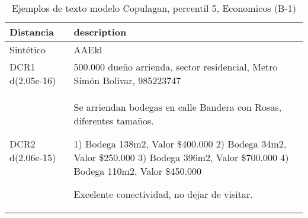 \begin{table}[H]
\centering
\fontsize{10}{14}\selectfont
\caption{Ejemplos de texto modelo Copulagan, percentil 5, Economicos (B-1)}
\label{table-example-economicos-b-1-copulagan-5p-text}
\begin{tabular}{|l|m{35em}|}
\hline
\rowcolor[gray]{0.8}
Distancia & description \\
\hline Sintético & AAEkl \\
\hline DCR1 d(2.05e-16) & 500.000  due\~no arrienda, sector residencial, Metro Sim\'on Bolivar, 985223747 \\
\hline DCR2 d(2.06e-15) & Se arriendan bodegas en calle Bandera con Rosas, diferentes tama\~nos.

1) Bodega 138m2, Valor \$400.000
2) Bodega 34m2, Valor \$250.000
3) Bodega 396m2, Valor \$700.000
4) Bodega 110m2, Valor \$450.000

Excelente conectividad, no dejar de visitar. \\
\hline
\end{tabular}
\end{table}
